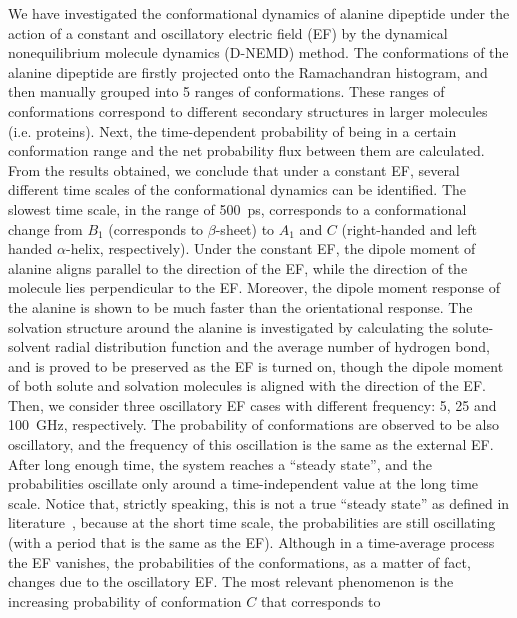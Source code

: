 \documentclass[a4paper,preprint,unsortedaddress,onecolumn]{revtex4-1}
\begin{document}
We have investigated the conformational
dynamics of alanine dipeptide under the action of a constant and oscillatory electric
field (EF) by the dynamical nonequilibrium molecule dynamics (D-NEMD) method.
The conformations of the alanine dipeptide are
firstly projected onto the Ramachandran histogram, and
then manually grouped into 5 ranges of conformations.
These ranges of conformations
correspond to different secondary structures in larger molecules (i.e. proteins).
Next, the time-dependent probability
of being in a certain conformation range and the net probability flux
between them are calculated. 
From the results obtained, we conclude that under a constant EF, several different time scales
of the conformational dynamics can be identified. The slowest time scale,
in the range of 500~ps, corresponds to a conformational change
from $B_1$ (corresponds to $\beta$-sheet) to $A_1$ and $C$ (right-handed
and left handed $\alpha$-helix, respectively).
Under the constant EF, the dipole moment of alanine aligns parallel to the direction of the EF, while the direction of the molecule lies perpendicular to the
EF. Moreover, the dipole moment response of the alanine is
shown to be much faster than the orientational response.
The solvation structure around the alanine is investigated
by calculating the solute-solvent radial distribution function and the average number of hydrogen
bond, and is proved to be preserved as the EF is turned on, though the
dipole moment of both solute and solvation molecules is aligned with the direction of the EF.
Then, we consider three oscillatory EF cases with different frequency:
5, 25 and 100~GHz, respectively. The
probability of conformations are observed to be also oscillatory,
and the frequency of this oscillation is the same as the external EF.
After long enough time,
the system reaches a ``steady state'', and the probabilities oscillate only around
a time-independent value at the long time scale. Notice that, strictly speaking, this is not a  true ``steady state'' as defined in
literature~\cite{seifert2010fluctuation}, because at the
short time scale, the probabilities are still oscillating (with a period that is the same as the EF).
Although in a time-average process the EF vanishes, the probabilities of the conformations, as a matter of fact, changes due to the oscillatory EF. The most relevant phenomenon
is the increasing probability of conformation $C$ that corresponds to
\end{document}
